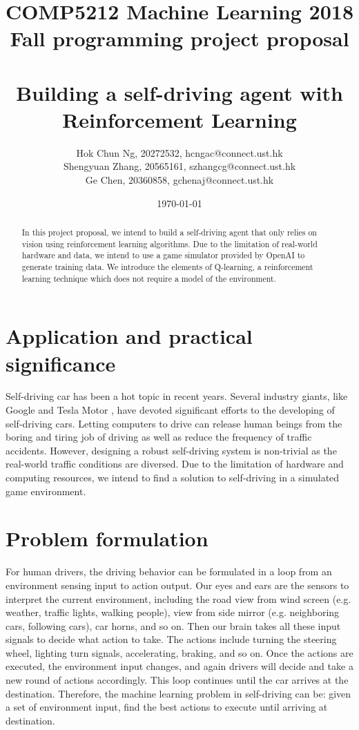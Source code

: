 \documentclass[a4paper]{article}
\title{COMP5212 Machine Learning 2018 Fall programming project proposal \\
       \ \ \ \ \\
       Building a self-driving agent with Reinforcement Learning}
\author{Hok Chun Ng, 20272532, hcngac@connect.ust.hk \\
        Shengyuan Zhang, 20565161, szhangcg@connect.ust.hk \\
        Ge Chen, 20360858, gchenaj@connect.ust.hk}
\date{\today}
\begin{document}
\maketitle

\begin{abstract}
In this project proposal, we intend to build a self-driving agent that only
relies on vision using reinforcement learning algorithms. Due to the limitation
of real-world hardware and data, we intend to use a game simulator provided by
OpenAI \cite{gym} to generate training data. We introduce the elements of Q-learning, a
reinforcement learning technique which does not require a model of the environment.
\end{abstract}

\section{Application and practical significance}

Self-driving car has been a hot topic in recent years. Several industry giants,
like Google \cite{google} and Tesla Motor \cite{tesla}, have devoted significant
efforts to the developing of self-driving cars. Letting computers to drive
can release human beings from the boring and tiring job of driving as well as reduce the frequency of
traffic accidents. However, designing a robust self-driving system is non-trivial
as the real-world traffic conditions are diversed. Due to the limitation of
hardware and computing resources, we intend to find a solution to self-driving in
a simulated game environment.


\section{Problem formulation}

For human drivers, the driving behavior can be formulated in a loop from an environment
sensing input to action output. Our eyes and ears are the sensors to interpret the
current environment, including the road view from wind screen (e.g. weather, traffic lights,
walking people), view from side mirror (e.g. neighboring cars, following cars),
car horns, and so on. Then our brain takes all these input signals to decide what action
to take. The actions include turning the steering wheel, lighting turn signals, accelerating,
braking, and so on. Once the actions are executed, the environment input changes, and again
drivers will decide and take a new round of actions accordingly. This loop continues until
the car arrives at the destination. Therefore, the machine learning problem in self-driving
can be: given a set of environment input, find the best actions to execute until arriving
at destination.
\end{document}
